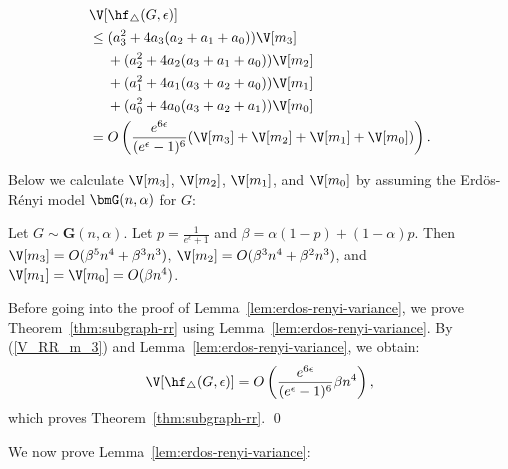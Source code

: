 \begin{align}
    &\V[\hf_{\triangle}(G, \epsilon)] \nonumber\\
    &\leq (a_3^2 + 4a_3(a_2 + a_1 + a_0)) \V[m_3] \nonumber\\
    & \hspace{4.5mm} + (a_2^2 + 4a_2(a_3 + a_1 + a_0)) \V[m_2] \nonumber\\
    & \hspace{4.5mm} + (a_1^2 + 4a_1(a_3 + a_2 + a_0)) \V[m_1] \nonumber\\
    & \hspace{4.5mm} + (a_0^2 + 4a_0(a_3 + a_2 + a_1)) \V[m_0] \nonumber\\
    &= O\left( \frac{e^{6\epsilon}}{(e^\epsilon-1)^6} (\V[m_3] + \V[m_2] + \V[m_1] + \V[m_0]) \right).
    \label{V_RR_m_3}
\end{align}

Below we calculate $\V[m_3]$, $\V[m_2]$, $\V[m_1]$, and $\V[m_0]$ by assuming the Erd\"{o}s-R\'{e}nyi model $\bmG(n, \alpha)$ for $G$:

\begin{lemma}\label{lem:erdos-renyi-variance}
  Let $G \sim \textbf{G}(n,\alpha)$. 
  Let $p = \frac{1}{e^\epsilon+1}$ and 
  $\beta = \alpha(1-p) + (1-\alpha)p$. 
  Then $\V[m_3] = O(\beta^5 n^4 + \beta^3
  n^3)$, $\V[m_2] = O(\beta^3 n^4 + \beta^2 n^3)$, and 
  $\V[m_1] = \V[m_0] = O(\beta n^4)$.
\end{lemma}
Before going into the proof of Lemma~\ref{lem:erdos-renyi-variance}, we prove Theorem~\ref{thm:subgraph-rr} using Lemma~\ref{lem:erdos-renyi-variance}. 
By (\ref{V_RR_m_3}) and Lemma~\ref{lem:erdos-renyi-variance}, we obtain: 
\begin{align*}
\V[\hf_{\triangle}(G, \epsilon)] = O\left( \frac{e^{6\epsilon}}{(e^\epsilon-1)^6} \beta n^4 \right),
\end{align*}
which proves Theorem~\ref{thm:subgraph-rr}. \qed

We now prove Lemma~\ref{lem:erdos-renyi-variance}:

